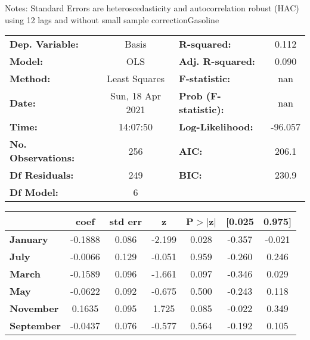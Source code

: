 Notes: \newline
 [1] Standard Errors are heteroscedasticity and autocorrelation robust (HAC) using 12 lags and without small sample correctionGasoline\begin{center}
\begin{tabular}{lclc}
\toprule
\textbf{Dep. Variable:}    &      Basis       & \textbf{  R-squared:         } &     0.112   \\
\textbf{Model:}            &       OLS        & \textbf{  Adj. R-squared:    } &     0.090   \\
\textbf{Method:}           &  Least Squares   & \textbf{  F-statistic:       } &       nan   \\
\textbf{Date:}             & Sun, 18 Apr 2021 & \textbf{  Prob (F-statistic):} &      nan    \\
\textbf{Time:}             &     14:07:50     & \textbf{  Log-Likelihood:    } &   -96.057   \\
\textbf{No. Observations:} &         256      & \textbf{  AIC:               } &     206.1   \\
\textbf{Df Residuals:}     &         249      & \textbf{  BIC:               } &     230.9   \\
\textbf{Df Model:}         &           6      & \textbf{                     } &             \\
\bottomrule
\end{tabular}
\begin{tabular}{lcccccc}
                   & \textbf{coef} & \textbf{std err} & \textbf{z} & \textbf{P$> |$z$|$} & \textbf{[0.025} & \textbf{0.975]}  \\
\midrule
\textbf{January}   &      -0.1888  &        0.086     &    -2.199  &         0.028        &       -0.357    &       -0.021     \\
\textbf{July}      &      -0.0066  &        0.129     &    -0.051  &         0.959        &       -0.260    &        0.246     \\
\textbf{March}     &      -0.1589  &        0.096     &    -1.661  &         0.097        &       -0.346    &        0.029     \\
\textbf{May}       &      -0.0622  &        0.092     &    -0.675  &         0.500        &       -0.243    &        0.118     \\
\textbf{November}  &       0.1635  &        0.095     &     1.725  &         0.085        &       -0.022    &        0.349     \\
\textbf{September} &      -0.0437  &        0.076     &    -0.577  &         0.564        &       -0.192    &        0.105     \\

\end{tabular}
\end{center}

